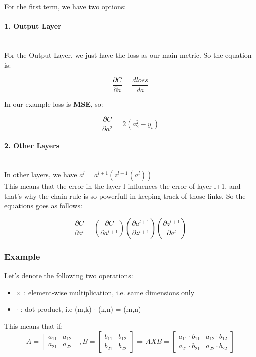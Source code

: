 \documentclass[12pt]{article}
\begin{document}
For the \underline{first} term, we have two options: 
 
\paragraph{1. Output Layer} \mbox{} \\
For the Output Layer, we just have the loss as our main metric. So the equation is:

\[
\dfrac{\partial C}{\partial a} = \dfrac{d loss}{da}
\]

In our example loss is \textbf{MSE}, so:

\[
\dfrac{\partial C}{\partial a^{2}} = 2(a_{2}^{2} - y_{i})
\]

\paragraph{2. Other Layers}  \mbox{} \\
In other layers, we have $a^{l} = a^{l+1}(z^{l+1}(a^{l}))$ \mbox{} \\
This means that the error in the layer l influences the error of layer l+1, and that's why the chain rule is so powerfull in keeping track of those links. So the equations goes as follows:

\[
\dfrac{\partial C}{\partial a^{l}} = \left(\dfrac{\partial C}{\partial a^{l+1}} \right)\left( \dfrac{\partial a^{l+1}}{\partial z^{l+1}}\right)\left( \dfrac{\partial z^{l+1}}{\partial a^{l}}\right)
\]

\subsubsection{Example}
Let's denote the following two operations:
\begin{itemize}
    \item $\times$ : element-wise multiplication, i.e. same dimensions only
    \item $\cdot$ : dot product, i.e (m,k) $\cdot$ (k,n) = (m,n)
\end{itemize}

This means that if:
\[
A =
\begin{bmatrix}
a_{11} & a_{12}\\
a_{21} & a_{22}
\end{bmatrix}
, B = 
\begin{bmatrix}
b_{11} & b_{12}\\
b_{21} & b_{22}
\end{bmatrix}
\Rightarrow
A X B = 
\begin{bmatrix}
a_{11}\cdot b_{11} & a_{12}\cdot b_{12}\\
a_{21}\cdot b_{21} & a_{22}\cdot b_{22}
\end{bmatrix}
\] 
\end{document}

